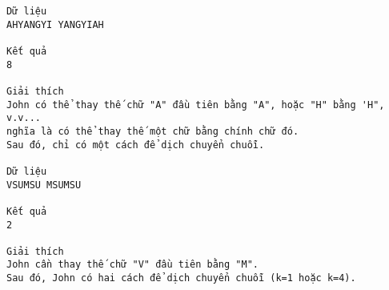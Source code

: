 \begin{verbatim}
Dữ liệu
AHYANGYI YANGYIAH

Kết quả
8

Giải thích
John có thể thay thế chữ "A" đầu tiên bằng "A", hoặc "H" bằng 'H", v.v...
nghĩa là có thể thay thế một chữ bằng chính chữ đó.
Sau đó, chỉ có một cách để dịch chuyển chuỗi.

Dữ liệu
VSUMSU MSUMSU

Kết quả
2

Giải thích
John cần thay thế chữ "V" đầu tiên bằng "M".
Sau đó, John có hai cách để dịch chuyển chuỗi (k=1 hoặc k=4).
\end{verbatim}